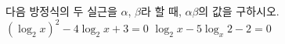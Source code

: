 다음 방정식의 두 실근을 $\alpha$, $\beta$라 할 때, $\alpha\beta$의 값을 구하시오.
 $(\log_2 x)^2-4\log_2 x+3=0$
 $\log_2 x-5\log_x 2-2=0$

